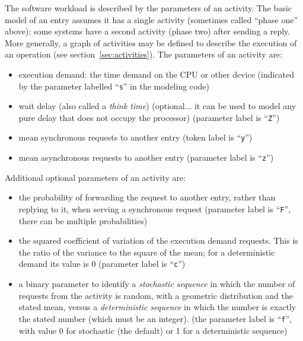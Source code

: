 \documentclass[11pt]{article}
\makeatletter
\newcommand{\parameter}[1]{\texttt{#1}\index{#1@\texttt{#1}}}
\makeatother
\begin{document}
The software workload is described by the parameters of an activity. The basic model of an
entry assumes it has a single activity (sometimes called ``phase one'' above); some systems have a
second activity (phase two) after sending a reply. More generally, a graph of activities may be defined
to describe the execution of an operation (see section~\ref{sec:activities}). The parameters of an activity are:
\begin{itemize}
\item execution demand: the time demand on the CPU or other device (indicated by the parameter
labelled ``\parameter{s}'' in the modeling code)
\item wait delay (also called a \emph{think time}) (optional... it can be used to model any pure delay that does
not occupy the processor) (parameter label is ``\parameter{Z}'')
\item mean synchronous requests to another entry (token label is ``\parameter{y}'')
\item mean asynchronous requests to another entry (parameter label is ``\parameter{z}'')
\end{itemize}
Additional optional parameters of an activity are:
\begin{itemize}
\item the probability of forwarding the request to another entry, rather than replying to it, when serving
a synchronous request (parameter label is ``\parameter{F}'', there can be multiple probabilities)
\item the squared coefficient of variation of the execution demand requests. This is the ratio of the
variance to the square of the mean; for a deterministic  demand its value is 0 (parameter label is ``\parameter{c}'')
\item a binary parameter to identify a \emph{stochastic sequence} in which the number of requests from the
activity is random, with a geometric distribution and the stated mean, versus a \emph{deterministic
sequence} in which the number is exactly the stated number (which must be an integer). (the
parameter label is ``\parameter{f}'', with value 0 for stochastic (the default) or 1 for a deterministic sequence)
\end{itemize}
\end{document}
